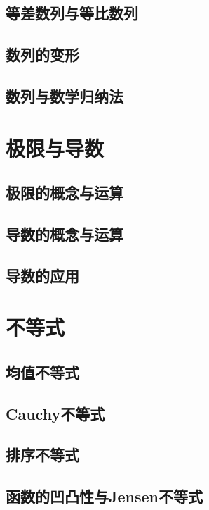\documentclass[lang=cn, zihao=4.5]{elegantbook}
\begin{document}
\section{等差数列与等比数列}

\section{数列的变形}

\section{数列与数学归纳法}

\chapter{极限与导数}

\section{极限的概念与运算}

\section{导数的概念与运算}

\section{导数的应用}

\chapter{不等式}

\section{均值不等式}

\section{Cauchy不等式}

\section{排序不等式}

\section{函数的凹凸性与Jensen不等式}
\end{document}
